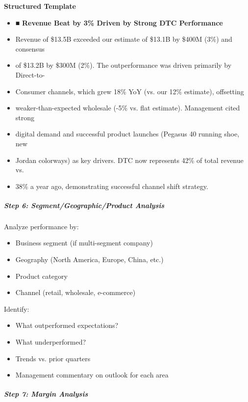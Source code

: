 \documentclass[11pt]{article}
\begin{document}
\textbf{Structured Template}
\begin{itemize}[leftmargin=*,itemsep=2pt,topsep=2pt]
\item {} ■ \textbf{Revenue Beat by 3\% Driven by Strong DTC Performance}
\item {} Revenue of \$13.5B exceeded our estimate of \$13.1B by \$400M (3\%) and consensus
\item {} of \$13.2B by \$300M (2\%). The outperformance was driven primarily by Direct-to-
\item {} Consumer channels, which grew 18\% YoY (vs. our 12\% estimate), offsetting
\item {} weaker-than-expected wholesale (-5\% vs. flat estimate). Management cited strong
\item {} digital demand and successful product launches (Pegasus 40 running shoe, new
\item {} Jordan colorways) as key drivers. DTC now represents 42\% of total revenue vs.
\item {} 38\% a year ago, demonstrating successful channel shift strategy.
\end{itemize}

\subparagraph{Step 6: Segment/Geographic/Product Analysis}\mbox{}\par

Analyze performance by:

\begin{itemize}[leftmargin=*,itemsep=2pt,topsep=2pt]
\item {} Business segment (if multi-segment company)
\item {} Geography (North America, Europe, China, etc.)
\item {} Product category
\item {} Channel (retail, wholesale, e-commerce)
\end{itemize}

Identify:

\begin{itemize}[leftmargin=*,itemsep=2pt,topsep=2pt]
\item {} What outperformed expectations?
\item {} What underperformed?
\item {} Trends vs. prior quarters
\item {} Management commentary on outlook for each area
\end{itemize}

\subparagraph{Step 7: Margin Analysis}\mbox{}\par
\end{document}
